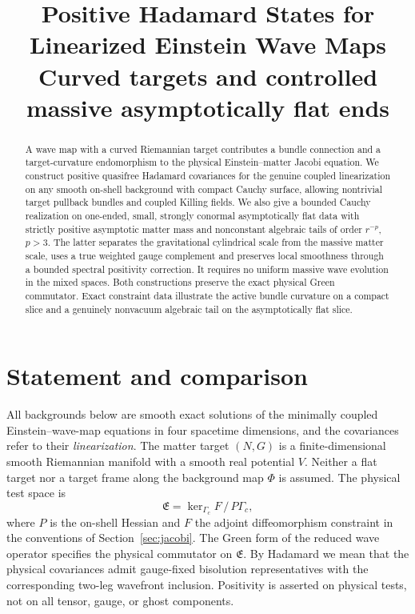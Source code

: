 \documentclass[11pt]{article}
\title{Positive Hadamard States for Linearized Einstein Wave Maps\\
\large Curved targets and controlled massive asymptotically flat ends}
\author{}
\date{}
\begin{document}
\maketitle

\begin{abstract}
A wave map with a curved Riemannian target contributes a bundle connection and a target-curvature endomorphism to the physical Einstein--matter Jacobi equation. We construct positive quasifree Hadamard covariances for the genuine coupled linearization on any smooth on-shell background with compact Cauchy surface, allowing nontrivial target pullback bundles and coupled Killing fields. We also give a bounded Cauchy realization on one-ended, small, strongly conormal asymptotically flat data with strictly positive asymptotic matter mass and nonconstant algebraic tails of order \(r^{-p}\), \(p>3\). The latter separates the gravitational cylindrical scale from the massive matter scale, uses a true weighted gauge complement and preserves local smoothness through a bounded spectral positivity correction. It requires no uniform massive wave evolution in the mixed spaces. Both constructions preserve the exact physical Green commutator. Exact constraint data illustrate the active bundle curvature on a compact slice and a genuinely nonvacuum algebraic tail on the asymptotically flat slice.
\end{abstract}

\section{Statement and comparison}\label{sec:setup}

All backgrounds below are smooth exact solutions of the minimally coupled Einstein--wave-map equations in four spacetime dimensions, and the covariances refer to their \emph{linearization}. The matter target \((N,G)\) is a finite-dimensional smooth Riemannian manifold with a smooth real potential \(V\). Neither a flat target nor a target frame along the background map \(\Phi\) is assumed. The physical test space is
\[
   \mathfrak E=\ker_{\Gamma_c}F\,/\,P\Gamma_c,
\]
where \(P\) is the on-shell Hessian and \(F\) the adjoint diffeomorphism constraint in the conventions of Section~\ref{sec:jacobi}. The Green form of the reduced wave operator specifies the physical commutator on \(\mathfrak E\). By Hadamard we mean that the physical covariances admit gauge-fixed bisolution representatives with the corresponding two-leg wavefront inclusion. Positivity is asserted on physical tests, not on all tensor, gauge, or ghost components.
\end{document}

